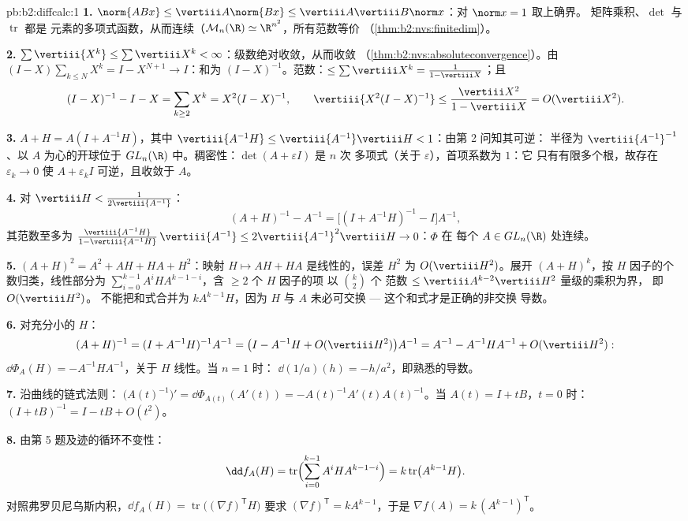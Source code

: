 \begin{solution}{pb:b2:diffcalc:1}
\textbf{1.} $\norm{ABx} \leq \vertiii A\norm{Bx} \leq
\vertiii A\vertiii B\norm x$：对 $\norm x = 1$ 取上确界。
矩阵乘积、$\det$ 与 $\operatorname{tr}$ 都是
元素的多项式函数，从而连续（$\mathcal M_n(\R)
\simeq \R^{n^2}$，所有范数等价
（\cref{thm:b2:nvs:finitedim}）。

\textbf{2.} $\sum\vertiii{X^k} \leq \sum\vertiii X^k <
\infty$：级数绝对收敛，从而收敛
（\cref{thm:b2:nvs:absoluteconvergence}）。由 $(I -
X)\sum_{k\leq N}X^k = I - X^{N+1} \to I$：和为 $(I -
X)^{-1}$。范数：$\leq \sum\vertiii X^k = \frac{1}{1 -
\vertiii X}$；且
\[
(I - X)^{-1} - I - X = \sum_{k\geq2}X^k = X^2(I - X)^{-1},
\qquad
\vertiii{X^2(I-X)^{-1}} \leq
\frac{\vertiii X^2}{1 - \vertiii X} = O(\vertiii X^2).
\]

\textbf{3.} $A + H = A(I + A^{-1}H)$，其中 $\vertiii{A^{-1}H}
\leq \vertiii{A^{-1}}\vertiii H < 1$：由第 2 问知其可逆：
半径为 $\vertiii{A^{-1}}^{-1}$、以 $A$ 为心的开球位于
$GL_n(\R)$ 中。稠密性：$\det(A + \varepsilon I)$ 是 $n$ 次
多项式（关于 $\varepsilon$），首项系数为 $1$：它
只有有限多个根，故存在 $\varepsilon_k \to 0$
使 $A + \varepsilon_kI$ 可逆，且收敛于 $A$。

\textbf{4.} 对 $\vertiii H < \frac{1}{2\vertiii{A^{-1}}}$：
\[
(A + H)^{-1} - A^{-1}
= \bigl[(I + A^{-1}H)^{-1} - I\bigr]A^{-1},
\]
其范数至多为 $\frac{\vertiii{A^{-1}H}}{1 -
\vertiii{A^{-1}H}}\,\vertiii{A^{-1}} \leq
2\vertiii{A^{-1}}^2\vertiii H \to 0$：$\Phi$ 在
每个 $A \in GL_n(\R)$ 处连续。

\textbf{5.} $(A+H)^2 = A^2 + AH + HA + H^2$：映射 $H
\mapsto AH + HA$ 是线性的，误差 $H^2$ 为
$O(\vertiii H^2)$。展开 $(A + H)^k$，按 $H$ 因子的个数归类，线性部分为
$\sum_{i=0}^{k-1}A^iHA^{k-1-i}$，含 $\geq 2$ 个 $H$ 因子的项
以 $\binom k2$ 个
范数 $\leq \vertiii A^{k-2}\vertiii H^2$ 量级的乘积为界，
即 $O(\vertiii H^2)$。
不能把和式合并为 $kA^{k-1}H$，因为 $H$ 与 $A$
未必可交换 --- 这个和式才是正确的非交换
导数。

\textbf{6.} 对充分小的 $H$：
\[
(A+H)^{-1} = (I + A^{-1}H)^{-1}A^{-1}
= \bigl(I - A^{-1}H + O(\vertiii H^2)\bigr)A^{-1}
= A^{-1} - A^{-1}HA^{-1} + O(\vertiii H^2) :
\]
$\dd\Phi_A(H) = -A^{-1}HA^{-1}$，关于 $H$ 线性。当 $n = 1$ 时：
$\dd(1/a)(h) = -h/a^2$，即熟悉的导数。

\textbf{7.} 沿曲线的链式法则：
$\bigl(A(t)^{-1}\bigr)' = \dd\Phi_{A(t)}(A'(t)) =
-A(t)^{-1}A'(t)A(t)^{-1}$。当 $A(t) = I + tB$，$t = 0$ 时：$(I +
tB)^{-1} = I - tB + O(t^2)$。

\textbf{8.} 由第 5 题及迹的循环不变性：
\[
\dd f_A(H) = \operatorname{tr}\Bigl(\sum_{i=0}^{k-1}
A^iHA^{k-1-i}\Bigr) = k\operatorname{tr}\bigl(A^{k-1}H\bigr) .
\]
对照弗罗贝尼乌斯内积，$\dd f_A(H) =
\operatorname{tr}\bigl((\nabla f)^{\mathsf T}H\bigr)$ 要求
$(\nabla f)^{\mathsf T} = kA^{k-1}$，于是 $\nabla f(A) =
k\,(A^{k-1})^{\mathsf T}$。


\end{solution}
